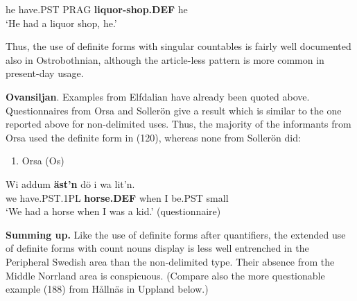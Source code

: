 he  have.PST  PRAG  \textbf{liquor-shop.DEF} he  \\ %


‘He had a liquor shop, he.’ 
\z


Thus, the use of definite forms with singular countables is fairly well documented also in Ostrobothnian, although the article-less pattern is more common in present-day usage.

\textbf{Ovansiljan}. Examples from Elfdalian have already been quoted above. Questionnaires from Orsa and Sollerön give a result which is similar to the one reported above for non-delimited uses. Thus, the majority of the informants from Orsa used the definite form in (120), whereas none from Sollerön did:

\begin{enumerate} %
\item 
\label{bkm:Ref224103820}Orsa (Os)

\end{enumerate} %
\ea\label{}
\gll Wi  addum  \textbf{äst’n} dö  i  wa  lit’n.\\


we  have.PST.1PL  \textbf{horse.DEF} when  I   be.PST  small\\ %


‘We had a horse when I was a kid.’ (questionnaire)
\z


\textbf{Summing up.} Like the use of definite forms after quantifiers, the extended use of definite forms with count nouns display is less well entrenched in the Peripheral Swedish area than the non-delimited type. Their absence from the Middle Norrland area is conspicuous. (Compare also the more questionable example (188) from Hållnäs in Uppland below.)

